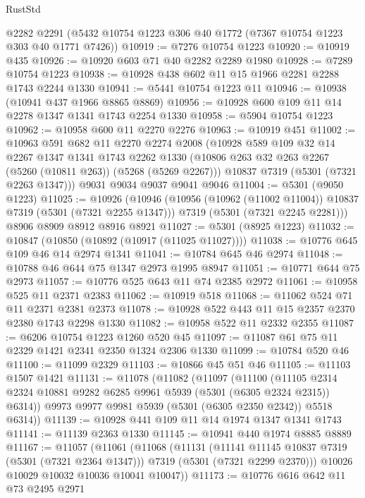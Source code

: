 \begin{lexlean}{RustStd}
\begin{coremodule}
    @2282
    @2291
    (@5432 @10754 @1223 @306 @40 @1772 (@7367 @10754 @1223 @303 @40 @1771 @7426))
@10919 := @7276 @10754 @1223
@10920 := @10919 @435
@10926 := @10920 @603 @71 @40 @2282 @2289 @1980
@10928 := @7289 @10754 @1223
@10938 := @10928 @438 @602 @11 @15 @1966 @2281 @2288 @1743 @2244 @1330
@10941 := @5441 @10754 @1223 @11
@10946 := @10938 (@10941 @437 @1966 @8865 @8869)
@10956 := @10928 @600 @109 @11 @14 @2278 @1347 @1341 @1743 @2254 @1330
@10958 := @5904 @10754 @1223
@10962 := @10958 @600 @11 @2270 @2276
@10963 := @10919 @451
@11002 := @10963
    @591
    @682
    @11
    @2270
    @2274
    @2008
    (@10928
      @589
      @109
      @32
      @14
      @2267
      @1347
      @1341
      @1743
      @2262
      @1330
      (@10806 @263 @32 @263 @2267 (@5260 (@10811 @263)) (@5268 (@5269 @2267)))
      @10837
      @7319
      (@5301 (@7321 @2263 @1347)))
    @9031
    @9034
    @9037
    @9041
    @9046
@11004 := @5301 (@9050 @1223)
@11025 := @10926
    (@10946
      (@10956 (@10962 (@11002 @11004)) @10837 @7319 (@5301 (@7321 @2255 @1347)))
      @7319
      (@5301 (@7321 @2245 @2281)))
    @8906
    @8909
    @8912
    @8916
    @8921
@11027 := @5301 (@8925 @1223)
@11032 := @10847 (@10850 (@10892 (@10917 (@11025 @11027))))
@11038 := @10776 @645 @109 @46 @14 @2974 @1341
@11041 := @10784 @645 @46 @2974
@11048 := @10788 @46 @644 @75 @1347 @2973 @1995 @8947
@11051 := @10771 @644 @75 @2973
@11057 := @10776 @525 @643 @11 @74 @2385 @2972
@11061 := @10958 @525 @11 @2371 @2383
@11062 := @10919 @518
@11068 := @11062 @524 @71 @11 @2371 @2381 @2373
@11078 := @10928 @522 @443 @11 @15 @2357 @2370 @2380 @1743 @2298 @1330
@11082 := @10958 @522 @11 @2332 @2355
@11087 := @6206 @10754 @1223 @1260 @520 @45
@11097 := @11087 @61 @75 @11 @2329 @1421 @2341 @2350 @1324 @2306 @1330
@11099 := @10784 @520 @46
@11100 := @11099 @2329
@11103 := @10866 @45 @51 @46
@11105 := @11103 @1507 @1421
@11131 := @11078
    (@11082
      (@11097
        (@11100
          (@11105 @2314 @2324 @10881 @9282 @6285 @9961 @5939 (@5301 (@6305 @2324 @2315)) @6314))
        @9973
        @9977
        @9981
        @5939
        (@5301 (@6305 @2350 @2342))
        @5518
        @6314))
@11139 := @10928 @441 @109 @11 @14 @1974 @1347 @1341 @1743
@11141 := @11139 @2363 @1330
@11145 := @10941 @440 @1974 @8885 @8889
@11167 := @11057
    (@11061
      (@11068
        (@11131
          (@11141 @11145 @10837 @7319 (@5301 (@7321 @2364 @1347)))
          @7319
          (@5301 (@7321 @2299 @2370)))
        @10026
        @10029
        @10032
        @10036
        @10041
        @10047))
@11173 := @10776 @616 @642 @11 @73 @2495 @2971

\end{coremodule}
\end{lexlean}
